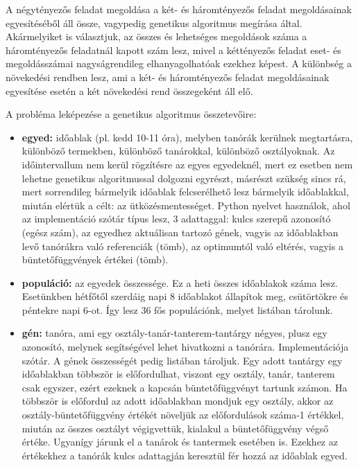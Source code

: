 \documentclass[a4paper,12pt]{article}
\begin{document}
A négytényezős feladat megoldása a két- és háromtényezős feladat megoldásainak egyesítéséből áll össze, vagypedig
genetikus algoritmus megírása által. Akármelyiket is választjuk, az összes és lehetséges megoldások száma a háromtényezős
feladatnál kapott szám lesz, mivel a kéttényezős feladat eset- és megoldásszámai nagyságrendileg elhanyagolhatóak
ezekhez képest. A különbség a növekedési rendben lesz, ami a két- és háromtényezős feladat megoldásainak egyesítése
esetén a két növekedési rend összegeként áll elő.

\noindent A probléma leképezése a genetikus algoritmus összetevőire:
\begin{itemize}
    \item \textbf{egyed:} időablak (pl. kedd 10-11 óra), melyben tanórák kerülnek megtartásra, különböző
        termekben, különböző tanárokkal, különböző osztályoknak. Az időintervallum nem kerül
        rögzítésre az egyes egyedeknél, mert ez esetben nem lehetne genetikus algoritmussal
        dolgozni egyrészt, másrészt szükség sincs rá, mert sorrendileg bármelyik időablak
        felcserélhető lesz bármelyik időablakkal, miután elértük a célt: az
        ütközésmentességet. Python nyelvet használok, ahol az implementáció szótár típus lesz,
        3 adattaggal: kulcs szerepű azonosító (egész szám), az egyedhez aktuálisan tartozó
        gének, vagyis az időablakban levő tanórákra való referenciák (tömb), az optimumtól
        való eltérés, vagyis a büntetőfüggvények értékei (tömb).
    \item \textbf{populáció:} az egyedek összessége. Ez a heti összes időablakok száma lesz. Esetünkben hétfőtől
        szerdáig napi 8 időablakot állapítok meg, csütörtökre és péntekre napi 6-ot. Így lesz 36 fős populációnk,
        melyet listában tárolunk.  
    \item \textbf{gén:} tanóra, ami egy osztály-tanár-tanterem-tantárgy négyes, plusz egy azonosító, melynek
      segítségével lehet hivatkozni a tanórára. Implementációja szótár. A gének összességét
      pedig listában tároljuk. Egy adott tantárgy egy időablakban többször is előfordulhat,
      viszont egy osztály, tanár, tanterem csak egyszer, ezért ezeknek a kapcsán
      büntetőfüggvényt tartunk számon. Ha többször is előfordul az adott időablakban mondjuk
      egy osztály, akkor az osztály-büntetőfüggvény értékét növeljük az előfordulások 
      száma-1 értékkel, miután az összes osztályt végigvettük, kialakul a büntetőfüggvény
      végső értéke. Ugyanígy járunk el a tanárok és tantermek esetében is. Ezekhez az
      értékekhez a tanórák kulcs adattagján keresztül fér hozzá az időablak egyed.

\end{itemize}
\end{document}
